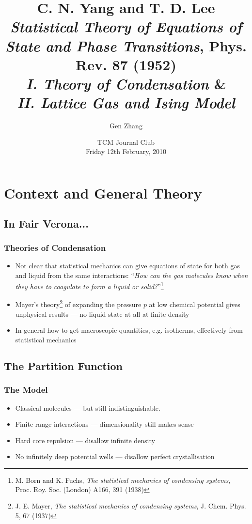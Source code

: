 \documentclass[british]{beamer}
\title[Yang-Lee Circle Theorem]{C. N. Yang and T. D. Lee \\ \vspace{0.2cm}
{\it Statistical Theory of Equations of State and Phase Transitions}, Phys. Rev. 87 (1952)\\ \vspace{0.15cm}
{\it I. Theory of Condensation} \&\\
{\it II. Lattice Gas and Ising Model}}
\author{Gen Zhang}
\date{TCM Journal Club \\ Friday 12th February, 2010}
\begin{document}
\frame{\titlepage}


\section{Context and General Theory}
\subsection{In Fair Verona...}
\frame
{
  \frametitle{Theories of Condensation}

  \begin{itemize}
  \item Not clear that statistical mechanics can give equations of state for both gas and liquid from the same interactions: ``{\it How can the gas molecules know when they have to coagulate to form a liquid or solid?}''\footnote{M. Born and K. Fuchs, {\it The statistical mechanics of condensing systems}, Proc. Roy. Soc. (London) A166, 391 (1938)}
  \item Mayer's theory\footnote{J. E. Mayer, {\it The statistical mechanics of condensing systems}, J. Chem. Phys. 5, 67 (1937)} of expanding the pressure $p$ at low chemical potential gives unphysical results --- no liquid state at all at finite density
  \item In general how to get macroscopic quantities, e.g. isotherms, effectively from statistical mechanics
  \end{itemize}
}

\subsection{The Partition Function}
\frame
{
  \frametitle{The Model}

  \begin{itemize}
  \item Classical molecules --- but still indistinguishable.
  \item Finite range interactions --- dimensionality still makes sense
  \item Hard core repulsion --- disallow infinite density
  \item No infinitely deep potential wells --- disallow perfect crystallisation
  \end{itemize}
}
\end{document}
